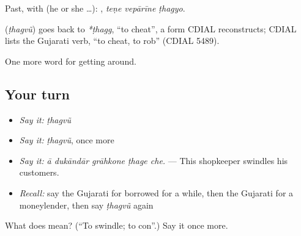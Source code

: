 Past, with  (he or she …):   , \emph{teṇe vepārīne ṭhagyo}.

\begin{cousinweb}
\textbf{} (\emph{ṭhagvũ}) goes back to \emph{*ṭhagg}, \textquotedblleft{}to cheat\textquotedblright{}, a form CDIAL reconstructs; CDIAL lists the Gujarati verb, \textquotedblleft{}to cheat, to rob\textquotedblright{} (CDIAL 5489).
\end{cousinweb}

\begin{grammarlens}[title={What you've built}]
One more word for getting around.
\end{grammarlens}

\subsection*{Your turn}
\begin{itemize}
\raggedright
  \item \emph{Say it:} \emph{ṭhagvũ}
  \item \emph{Say it:} \emph{ṭhagvũ}, once more
  \item \emph{Say it:} \emph{ā dukāndār grāhkone ṭhage che.} — This shopkeeper swindles his customers.
  \item \emph{Recall:} say the Gujarati for borrowed for a while, then the Gujarati for a moneylender, then say \emph{ṭhagvũ} again
\end{itemize}

\begin{tcolorbox}[breakable,colback=teal!4,colframe=teal!35!black,title={Before you move on}]
What does  mean? (\textquotedblleft{}To swindle; to con\textquotedblright{}.) Say it once more.
\end{tcolorbox}
